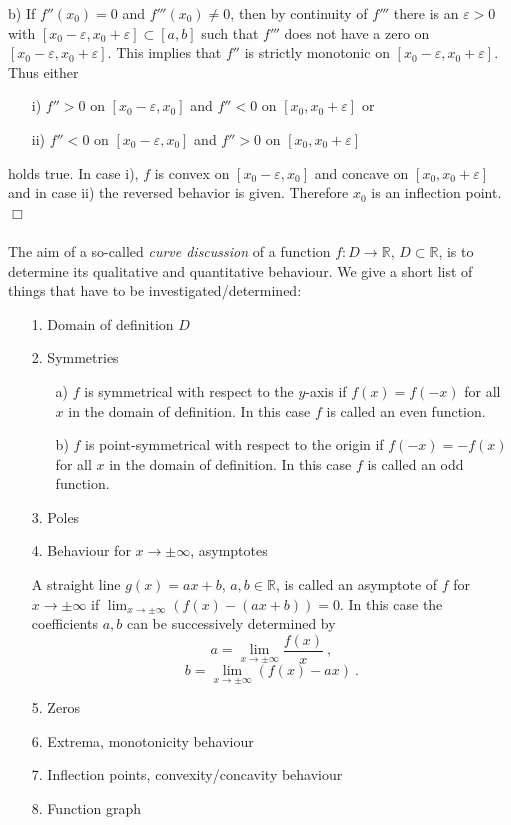 b) If $f''(x_0)=0$ and $f'''(x_0)\neq 0$, then by continuity of $f'''$ there is an $\varepsilon>0$ with 
   $[x_0-\varepsilon,x_0+\varepsilon]\subset[a,b]$ such that $f'''$ does not have a zero on $[x_0-\varepsilon,x_0+\varepsilon]$.
   This implies that $f''$ is strictly monotonic on $[x_0-\varepsilon,x_0+\varepsilon]$. Thus either
   \begin{enumerate}
    \item[i)] $f''>0$ on $[x_0-\varepsilon,x_0]$ and  $f''< 0$ on $[x_0,x_0+\varepsilon]$ or
    \item[ii)] $f''< 0$ on $[x_0-\varepsilon,x_0]$ and  $f''> 0$ on $[x_0,x_0+\varepsilon]$
   \end{enumerate}
   holds true.
   In case i), $f$ is convex on $[x_0-\varepsilon,x_0]$ and concave on $[x_0,x_0+\varepsilon]$ and 
   in case ii) the reversed behavior is given.
   Therefore $x_0$ is an inflection point.
\hfill$\Box$
 \\ \\
The aim of a so-called \emph{curve discussion} of a function $f:D\rightarrow \mathbb{R}$, $D\subset \mathbb{R}$, is to determine its qualitative and 
quantitative behaviour. We give a short list of things that have to be investigated/determined:

\begin{enumerate}
 \item[1.] Domain of definition $D$
 \item[2.] Symmetries
    \begin{enumerate}
    \item[a)] $f$ is symmetrical with respect to the $y$-axis if $f(x)=f(-x)$ for all $x$ in the domain of definition.
              In this case $f$ is called an even function.
    \item[b)] $f$ is point-symmetrical with respect to the origin if $f(-x)=-f(x)$ for all  $x$ in the domain of definition.
              In this case $f$ is called an odd function.
    \end{enumerate}
  \item[3.] Poles
  \item[4.] Behaviour for $x\longrightarrow \pm\infty$, asymptotes
      
      A straight line $g(x)=ax+b$, $a,b\in\mathbb{R}$, is called an asymptote of $f$ for $x\rightarrow\pm\infty$ 
       if $\lim_{x\rightarrow\pm\infty}(f(x)-(ax+b)) = 0$. In this case the coefficients $a,b$ can be 
       successively determined by
       $$
	     a = \lim_{x\rightarrow\pm\infty}\frac{f(x)}{x}\ , 
       $$
       $$
	     b = \lim_{x\rightarrow\pm\infty}(f(x)-ax) \ .
       $$
  \item[5.] Zeros
  \item[6.] Extrema, monotonicity behaviour
  \item[7.] Inflection points, convexity/concavity behaviour
  \item[8.] Function graph
\end{enumerate}
 
